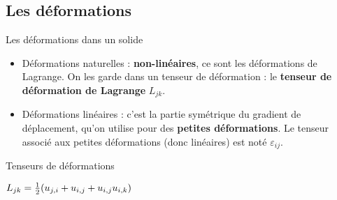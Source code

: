 \documentclass[10pt]{beamer}
\begin{document}
\subsection{Les déformations}
\begin{frame}{Les déformations dans un solide}
\begin{itemize}
\item Déformations naturelles : \textbf{non-linéaires}, ce sont les déformations de Lagrange. On les garde dans un tenseur de déformation : le \textbf{tenseur de déformation de Lagrange} $L_{jk}$.
\item Déformations linéaires : c'est la partie symétrique du gradient de déplacement, qu'on utilise pour des \textbf{petites déformations}. Le tenseur associé aux petites déformations (donc linéaires) est noté $\varepsilon_{ij}$.
\end{itemize}
\begin{block}{Tenseurs de déformations}
\begin{center}
$L_{jk} =\frac{1}{2} (u_{j,i} + u_{i,j} + u_{i,j}u_{i,k}) \qquad \strut$ 
\end{center}
\end{block}

\end{frame}
\end{document}
